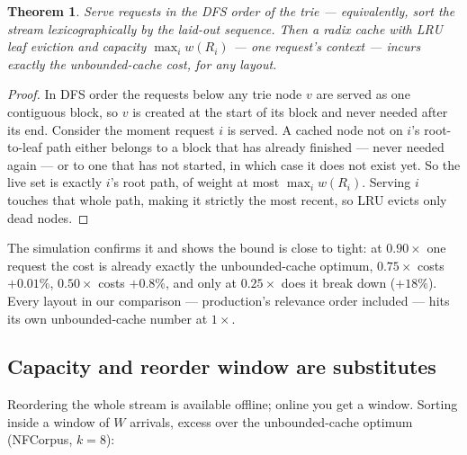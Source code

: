 \documentclass[11pt]{article}
\theoremstyle{plain}
\newtheorem{theorem}{Theorem}
\begin{document}
\begin{theorem}
Serve requests in the DFS order of the trie --- equivalently, sort the stream lexicographically by the laid-out sequence. Then a radix cache with LRU leaf eviction and capacity $\max_i w(R_i)$ --- \emph{one request's context} --- incurs exactly the unbounded-cache cost, for any layout.
\end{theorem}
\begin{proof}
In DFS order the requests below any trie node $v$ are served as one contiguous block, so $v$ is created at the start of its block and never needed after its end. Consider the moment request $i$ is served. A cached node not on $i$'s root-to-leaf path either belongs to a block that has already finished --- never needed again --- or to one that has not started, in which case it does not exist yet. So the live set is exactly $i$'s root path, of weight at most $\max_i w(R_i)$. Serving $i$ touches that whole path, making it strictly the most recent, so LRU evicts only dead nodes. 
\end{proof}

The simulation confirms it and shows the bound is close to tight: at $0.90\times$ one request the cost is already exactly the unbounded-cache optimum, $0.75\times$ costs $+0.01\%$, $0.50\times$ costs $+0.8\%$, and only at $0.25\times$ does it break down ($+18\%$). Every layout in our comparison --- production's relevance order included --- hits its own unbounded-cache number at $1\times$.

\subsection{Capacity and reorder window are substitutes}

Reordering the whole stream is available offline; online you get a window. Sorting inside a window of $W$ arrivals, excess over the unbounded-cache optimum (NFCorpus, $k=8$):

\begin{center}\small
{}\end{center}
\end{document}
